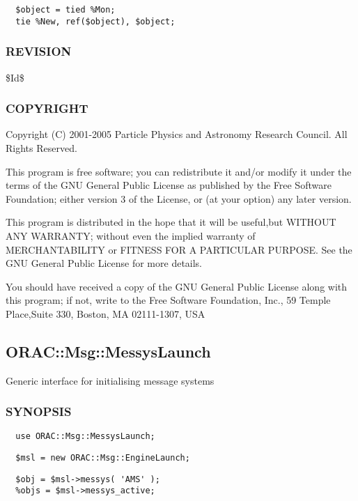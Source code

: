 \begin{verbatim}
  $object = tied %Mon;
  tie %New, ref($object), $object;
\end{verbatim}
\subsubsection*{REVISION\label{ORAC::Msg::EngineLaunch_REVISION}}


\$Id\$

\subsubsection*{COPYRIGHT\label{ORAC::Msg::EngineLaunch_COPYRIGHT}}


Copyright (C) 2001-2005 Particle Physics and Astronomy Research
Council. All Rights Reserved.



This program is free software; you can redistribute it and/or modify it under
the terms of the GNU General Public License as published by the Free Software
Foundation; either version 3 of the License, or (at your option) any later
version.



This program is distributed in the hope that it will be useful,but WITHOUT ANY
WARRANTY; without even the implied warranty of MERCHANTABILITY or FITNESS FOR A
PARTICULAR PURPOSE. See the GNU General Public License for more details.



You should have received a copy of the GNU General Public License along with
this program; if not, write to the Free Software Foundation, Inc., 59 Temple
Place,Suite 330, Boston, MA  02111-1307, USA

\subsection{ORAC::Msg::MessysLaunch\label{ORAC::Msg::MessysLaunch}}


Generic interface for initialising message systems

\subsubsection*{SYNOPSIS\label{ORAC::Msg::MessysLaunch_SYNOPSIS}}
\begin{verbatim}
  use ORAC::Msg::MessysLaunch;
\end{verbatim}
\begin{verbatim}
  $msl = new ORAC::Msg::EngineLaunch;
\end{verbatim}
\begin{verbatim}
  $obj = $msl->messys( 'AMS' );
  %objs = $msl->messys_active;
\end{verbatim}
